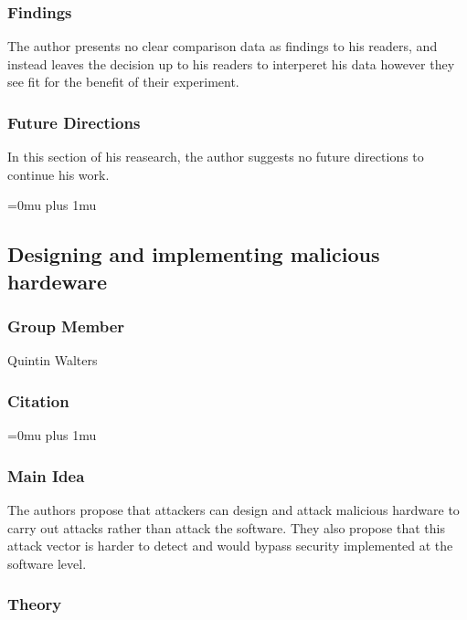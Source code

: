\subsubsection{Findings}

\noindent
The author presents no clear comparison data as findings to his readers, and instead leaves the decision up to his readers to interperet his data however they see fit for the benefit of their experiment.

\subsubsection{Future Directions}

\noindent
In this section of his reasearch, the author suggests no future directions to continue his work.

\Urlmuskip=0mu plus 1mu\relax

\noindent
\subsection{Designing and implementing malicious hardeware}

\subsubsection{Group Member}

\noindent
Quintin Walters

\noindent
\subsubsection{Citation}

\Urlmuskip=0mu plus 1mu\relax

\subsubsection{Main Idea}

\noindent
The authors propose that attackers can design and attack malicious hardware to carry out attacks rather than attack the software.  They also propose that this attack vector is harder to detect and would bypass security implemented at the software level.

\subsubsection{Theory}

